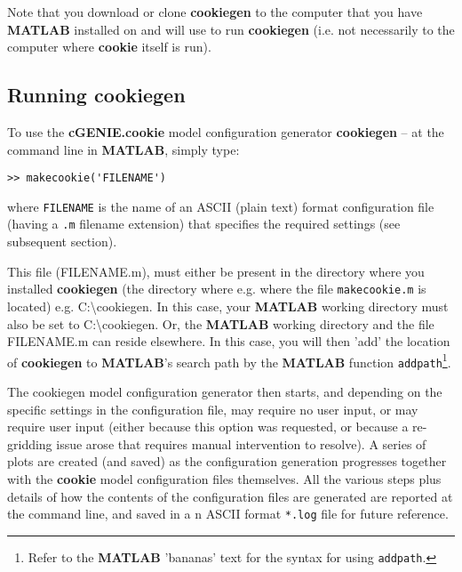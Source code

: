 Note that you download or clone \textbf{cookiegen} to the computer that you have \textbf{MATLAB} installed on and will use to run \textbf{cookiegen} (i.e. not necessarily to the computer where \textbf{cookie} itself is run).


\newpage

\subsection{Running cookiegen}

To use the \textbf{cGENIE.cookie} model configuration generator \textbf{cookiegen} -- at the command line in \textbf{MATLAB}, simply type:

\vspace{-2mm}\begin{verbatim}
>> makecookie('FILENAME')
\end{verbatim}\vspace{-2mm}

\noindent where \texttt{FILENAME} is the name of an ASCII  (plain text) format configuration file (having a \texttt{.m} filename extension) that specifies the required settings (see subsequent section).

This file (\textsf{\footnotesize FILENAME.m}), must either be present in the directory where you installed \textbf{cookiegen} (the directory where e.g. where the file \texttt{makecookie.m} is located) e.g. \textsf{\footnotesize C:\textbackslash cookiegen}. In this case, your \textbf{MATLAB} working directory must also be  set to \textsf{\footnotesize C:\textbackslash cookiegen}. Or, the \textbf{MATLAB} working directory and the file \textsf{\footnotesize FILENAME.m} can reside elsewhere. In this case, you will then 'add' the location of \textbf{cookiegen} to \textbf{MATLAB}'s search path by the \textbf{MATLAB} function \texttt{addpath}\footnote{Refer to the \textbf{MATLAB} '\textsf{bananas}' text for the syntax for using \texttt{addpath}.}.

The \textsf{\footnotesize cookiegen} model configuration generator then starts, and depending on the specific settings in the configuration file, may require no user input, or may require user input (either because this option was requested, or because a re-gridding issue arose that requires manual intervention to resolve). A series of plots are created (and saved) as the configuration generation progresses together with the \textbf{cookie} model configuration files themselves. All the various steps plus details of how the contents of the configuration files are generated are reported at the command line, and saved in a n ASCII format \texttt{*.log} file for future reference.

